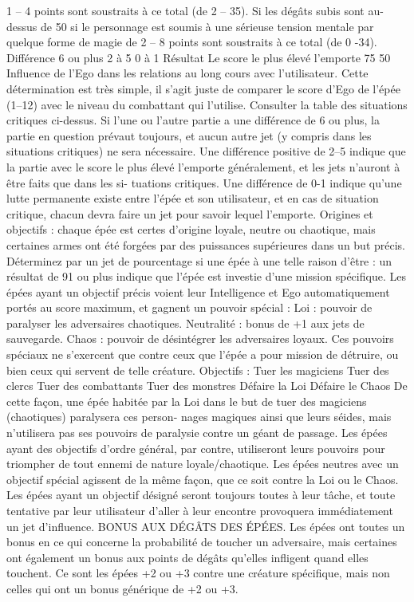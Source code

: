 \documentclass[12pt]{article}
\begin{document}
{1 – 4 points sont soustraits à ce total (de 2 – 35). Si les dégâts subis sont au-dessus de 50 %
si le personnage est soumis à une sérieuse tension mentale par quelque forme de magie de 2 – 8
points sont soustraits à ce total (de 0 -34).
Différence
6 ou plus
2 à 5
0 à 1
Résultat
Le score le plus élevé l’emporte
75 %
50 %
Influence de l’Ego dans les relations au long cours avec l’utilisateur. Cette détermination est très
simple, il s’agit juste de comparer le score d’Ego de l’épée (1–12) avec le niveau du combattant
qui l’utilise. Consulter la table des situations critiques ci-dessus. Si l’une ou l’autre partie a une
différence de 6 ou plus, la partie en question prévaut toujours, et aucun autre jet (y compris dans
les situations critiques) ne sera nécessaire. Une différence positive de 2–5 indique que la partie
avec le score le plus élevé l’emporte généralement, et les jets n’auront à être faits que dans les si-
tuations critiques. Une différence de 0-1 indique qu’une lutte permanente existe entre l’épée et son
utilisateur, et en cas de situation critique, chacun devra faire un jet pour savoir lequel l’emporte.
Origines et objectifs : chaque épée est certes d’origine loyale, neutre ou chaotique, mais certaines armes
ont été forgées par des puissances supérieures dans un but précis. Déterminez par un jet de pourcentage si
une épée à une telle raison d’être : un résultat de 91 ou plus indique que l’épée est investie d’une mission
spécifique. Les épées ayant un objectif précis voient leur Intelligence et Ego automatiquement portés au score
maximum, et gagnent un pouvoir spécial :
Loi : pouvoir de paralyser les adversaires chaotiques.
Neutralité : bonus de +1 aux jets de sauvegarde.
Chaos : pouvoir de désintégrer les adversaires loyaux.
Ces pouvoirs spéciaux ne s’exercent que contre ceux que l’épée a pour mission de détruire, ou bien ceux qui
servent de telle créature.
Objectifs :
Tuer les magiciens
Tuer des clercs
Tuer des combattants
Tuer des monstres
Défaire la Loi
Défaire le Chaos
De cette façon, une épée habitée par la Loi dans le but de tuer des magiciens (chaotiques) paralysera ces person-
nages magiques ainsi que leurs séides, mais n’utilisera pas ses pouvoirs de paralysie contre un géant de passage.
Les épées ayant des objectifs d’ordre général, par contre, utiliseront leurs pouvoirs pour triompher de tout ennemi
de nature loyale/chaotique. Les épées neutres avec un objectif spécial agissent de la même façon, que ce soit
contre la Loi ou le Chaos.
Les épées ayant un objectif désigné seront toujours toutes à leur tâche, et toute tentative par leur utilisateur d’aller
à leur encontre provoquera immédiatement un jet d’influence.
BONUS AUX DÉGÂTS DES ÉPÉES. Les épées ont toutes un bonus en ce qui concerne la probabilité de toucher un
adversaire, mais certaines ont également un bonus aux points de dégâts qu’elles infligent quand elles touchent. Ce
sont les épées +2 ou +3 contre une créature spécifique, mais non celles qui ont un bonus générique de +2 ou +3.

}%
\end{document}
